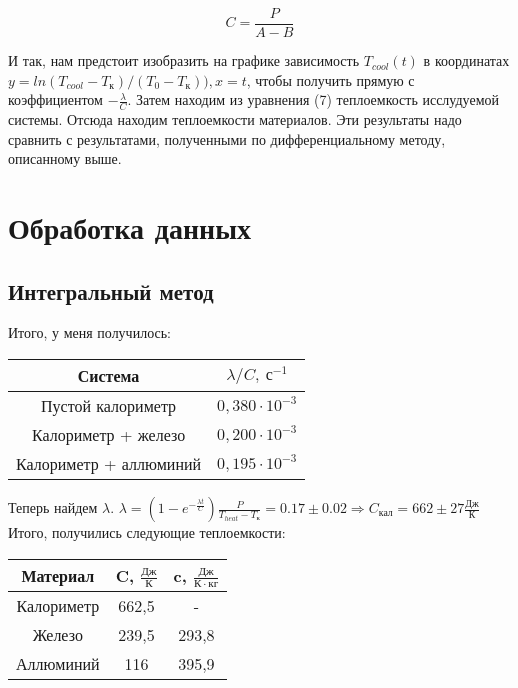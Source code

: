 \documentclass[a4paper, 12pt]{article}
\begin{document}
\begin{equation}
    C = \frac{P}{A - B}
\end{equation}

И так, нам предстоит изобразить на графике зависимость \(T_{cool}(t)\) в координатах \(y = ln(T_{cool} - T_к)/(T_0 - T_к)), x = t\), чтобы получить прямую с коэффициентом \(-\frac{\lambda}{C}\). Затем находим из уравнения (7) теплоемкость исслудуемой системы. Отсюда находим теплоемкости материалов. Эти результаты надо сравнить с результатами, полученными по дифференциальному методу, описанному выше.

\section{Обработка данных}
\subsection{Интегральный метод}
Итого, у меня получилось:
\begin{table}[h]
    \centering
    \begin{tabular}{|c|c|}
    \hline
         Система & \(\lambda/C, \ с^{-1}\) \\
    \hline
         Пустой калориметр      & \(0,380 \cdot 10^{-3}\) \\
         Калориметр + железо    & \(0,200 \cdot 10^{-3}\) \\
         Калориметр + аллюминий & \(0,195 \cdot 10^{-3}\) \\
    \hline
    \end{tabular}
\end{table}

Теперь найдем \(\lambda\). \(\lambda = (1 - e^{-\frac{\lambda t}{C}})\frac{P}{T_{heat} - T_к} = 0.17 \pm 0.02 \Rightarrow C_{кал} = 662 \pm 27 \frac{Дж}{К}\)
\\
Итого, получились следующие теплоемкости:
\begin{table}[h]
    \centering
    \begin{tabular}{|c|c|c|}
    \hline
         Материал & C, \(\frac{Дж}{К}\) & c, \(\frac{Дж}{К \cdot кг}\)  \\
    \hline
         Калориметр & 662,5 & - \\
         Железо     & 239,5 & 293,8 \\
         Аллюминий  & 116  &  395,9 \\
    \hline
    \end{tabular}
\end{table}
\end{document}
